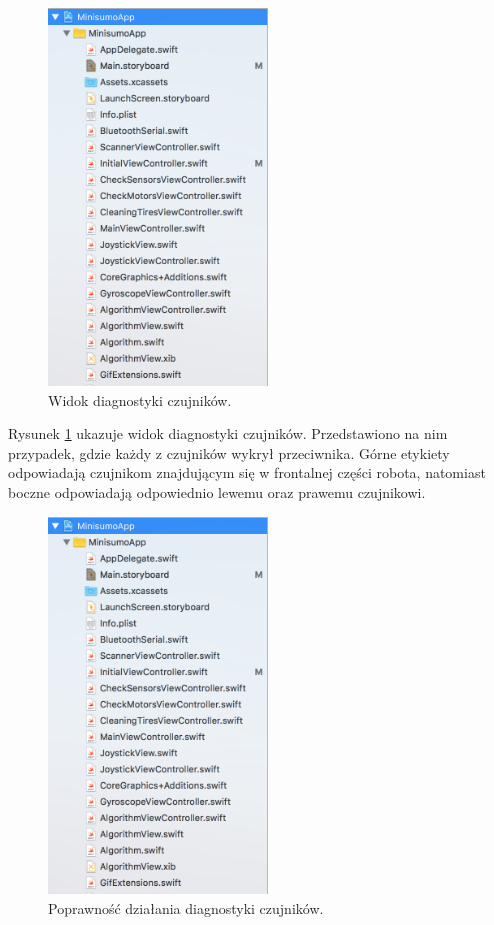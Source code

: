 \begin{figure}[H]
	\centering
		\includegraphics[width=0.75\linewidth, height=10cm, keepaspectratio]{pic05/structure.png}
	\caption{Widok diagnostyki czujników.}
	\label{fig:diagsensors}	
\end{figure}

Rysunek \ref{fig:diagsensors} ukazuje widok diagnostyki czujników. Przedstawiono na nim przypadek, gdzie każdy z czujników wykrył przeciwnika. Górne etykiety odpowiadają czujnikom znajdującym się w frontalnej części robota, natomiast boczne odpowiadają odpowiednio lewemu oraz prawemu czujnikowi.


\begin{figure}[H]
	\centering
		\includegraphics[width=0.75\linewidth, height=10cm, keepaspectratio]{pic05/structure.png}
	\caption{Poprawność działania diagnostyki czujników.}
	\label{fig:realsensors}	
\end{figure}

